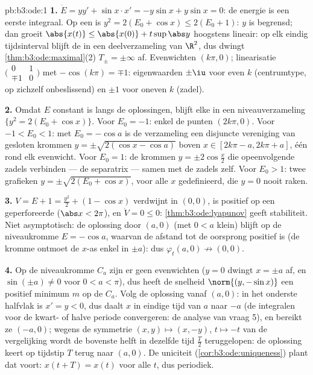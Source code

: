 \begin{solution}{pb:b3:ode:1}
\textbf{1.} $\dot E = yy' + \sin x\cdot x' = -y\sin x + y\sin x =
0$: de energie is een eerste integraal. Op een 
is $y^2 = 2(E_0 + \cos x) \leq 2(E_0 + 1)$: $y$ is begrensd; dan
groeit $\abs{x(t)} \leq \abs{x(0)} + t\sup\abs y$ hoogstens
lineair: op elk eindig tijdsinterval blijft de  in een
 deelverzameling van $\R^2$, dus dwingt
\cref{thm:b3:ode:maximal}(2) $T_\pm = \pm\infty$ af. Evenwichten
$(k\pi, 0)$; linearisatie $\bigl(\begin{smallmatrix}0&1\\
\mp1&0\end{smallmatrix}\bigr)$ met $-\cos(k\pi) = \mp1$:
eigenwaarden $\pm\iu$ voor even $k$ (centrumtype, op zichzelf
onbeslissend) en $\pm1$ voor oneven $k$ (zadel).

\textbf{2.} Omdat $E$ constant is langs de oplossingen, blijft
elke  in een niveauverzameling $\{y^2 = 2(E_0 + \cos x)\}$.
Voor $E_0 = -1$: enkel de punten $(2k\pi, 0)$. Voor $-1 < E_0 <
1$: met $E_0 = -\cos a$ is de verzameling een disjuncte
vereniging van gesloten krommen $y = \pm\sqrt{2(\cos x - \cos
a)}$ boven $x \in [2k\pi - a, 2k\pi + a]$, één rond elk 
evenwicht. Voor $E_0 = 1$: de krommen $y = \pm2\cos\frac x2$ die
opeenvolgende zadels verbinden --- de separatrix --- samen met de
zadels zelf. Voor $E_0 > 1$: twee grafieken $y = \pm\sqrt{2(E_0 +
\cos x)}$, voor alle $x$ gedefinieerd, die $y = 0$ nooit raken.

\textbf{3.} $V = E + 1 = \frac{y^2}2 + (1 - \cos x)$ verdwijnt in
$(0,0)$, is positief op een geperforeerde  ($\abs x <
2\pi$), en $\dot V = 0 \leq 0$: \cref{thm:b3:ode:lyapunov} geeft
stabiliteit. Niet asymptotisch: de oplossing door $(a, 0)$ (met
$0 < a$ klein) blijft op de niveaukromme $E = -\cos a$, waarvan
de afstand tot de oorsprong positief is (de kromme ontmoet de
$x$-as enkel in $\pm a$): dus $\varphi_t(a, 0) \not\to (0,0)$.

\textbf{4.} Op de niveaukromme $C_a$ zijn er geen evenwichten
($y = 0$ dwingt $x = \pm a$ af, en $\sin(\pm a) \neq 0$ voor $0 <
a < \pi$), dus heeft de snelheid $\norm{(y, -\sin x)}$ een
positief minimum $m$ op de  $C_a$. Volg de oplossing
vanaf $(a, 0)$: in het onderste halfvlak is $x' = y < 0$, dus
daalt $x$ in eindige tijd van $a$ naar $-a$ (de integralen voor
de kwart- of halve periode convergeren: de analyse van vraag 5),
en bereikt ze $(-a, 0)$; wegens de symmetrie $(x, y) \mapsto (x,
-y)$, $t \mapsto -t$ van de vergelijking wordt de bovenste helft
in dezelfde tijd $\frac T2$ teruggelopen: de oplossing keert op
tijdstip $T$ terug naar $(a, 0)$. De uniciteit
(\cref{cor:b3:ode:uniqueness}) plant dat voort: $x(t + T) = x(t)$
voor alle $t$, dus periodiek.


\end{solution}
